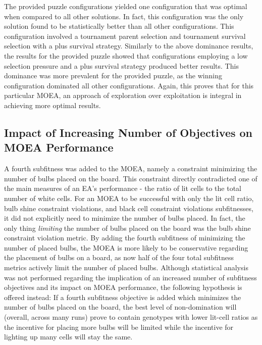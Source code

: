 \documentclass[11pt]{article}
\begin{document}
The provided puzzle configurations yielded one configuration that was optimal when compared 
to all other solutions. In fact,
this configuration was the only solution found to be statistically better than all other 
configurations. This configuration involved
a tournament parent selection and tournament survival selection with a plus survival strategy.
Similarly to the above dominance results, the results for the provided puzzle showed that 
configurations employing a low selection pressure and a plus survival strategy produced better 
results. This dominance was more prevalent for the provided puzzle, as the winning configuration
dominated all other configurations. Again, this proves that for this particular MOEA, an approach
of exploration over exploitation is integral in achieving more optimal results.


\subsection{Impact of Increasing Number of Objectives on MOEA Performance}

A fourth subfitness was added to the MOEA, namely a constraint minimizing
the number of bulbs placed on the board. This constraint directly contradicted one of the main
measures of an EA's performance - the ratio of lit cells to the total number of white cells.
For an MOEA to be successful with only the lit cell ratio, bulb shine constraint violations, and
black cell constraint violations subfitnesses, it did not explicitly need to minimize the number 
of bulbs
placed. In fact, the only thing \textit{limiting} the number of bulbs placed on the board was the
bulb shine constraint violation metric. By adding the fourth subfitness of minimizing the number
of placed bulbs, the MOEA is more likely to be conservative regarding the placement of bulbs on
a board, as now half of the four total subfitness metrics actively limit the number of placed bulbs.
Although statistical analysis was not performed regarding the implication of an increased number
of subfitness objectives and its impact on MOEA performance, the following hypothesis is offered
instead: If a fourth subfitness objective is added which minimizes the number of bulbs placed
on the board, the best level of non-domination will (overall, across many runs) prove to contain 
genotypes with lower lit-cell ratios as the incentive for placing more bulbs will be limited
while the incentive for lighting up many cells will stay the same.
\end{document}
